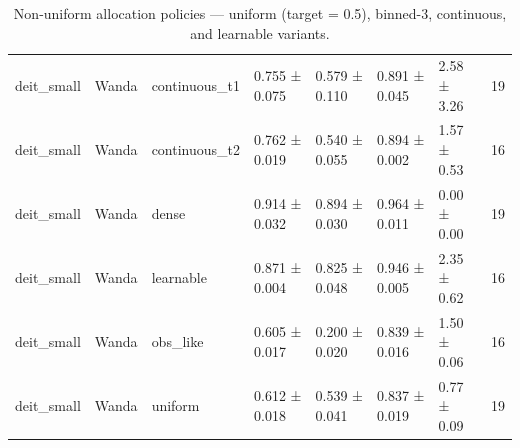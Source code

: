 \begin{table}[t]
\begin{tabular}{llllllll}
deit\_small & Wanda & continuous\_t1 & 0.755 ± 0.075 & 0.579 ± 0.110 & 0.891 ± 0.045 & 2.58 ± 3.26 & 19 \\
deit\_small & Wanda & continuous\_t2 & 0.762 ± 0.019 & 0.540 ± 0.055 & 0.894 ± 0.002 & 1.57 ± 0.53 & 16 \\
deit\_small & Wanda & dense & 0.914 ± 0.032 & 0.894 ± 0.030 & 0.964 ± 0.011 & 0.00 ± 0.00 & 19 \\
deit\_small & Wanda & learnable & 0.871 ± 0.004 & 0.825 ± 0.048 & 0.946 ± 0.005 & 2.35 ± 0.62 & 16 \\
deit\_small & Wanda & obs\_like & 0.605 ± 0.017 & 0.200 ± 0.020 & 0.839 ± 0.016 & 1.50 ± 0.06 & 16 \\
deit\_small & Wanda & uniform & 0.612 ± 0.018 & 0.539 ± 0.041 & 0.837 ± 0.019 & 0.77 ± 0.09 & 19 \\
\bottomrule
\end{tabular}
\caption{Non-uniform allocation policies — uniform (target = 0.5), binned-3, continuous, and learnable variants.}
\label{tab:nonuniform}
\end{table}